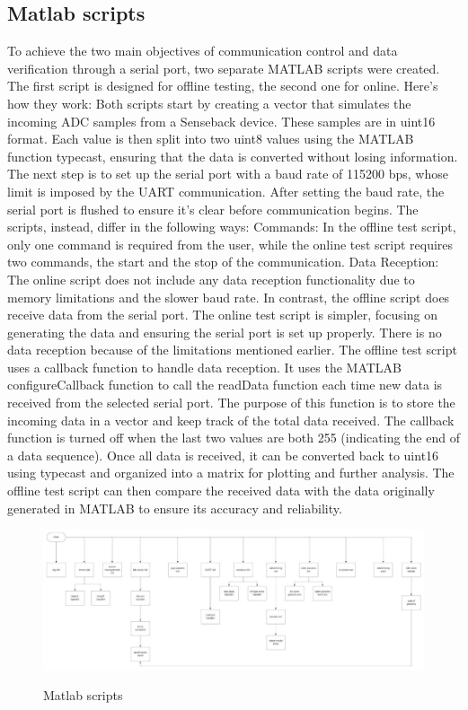 \documentclass{Configuration_Files/PoliMi3i_thesis}
\begin{document}
\subsection{Matlab scripts}

To achieve the two main objectives of communication control and data verification through a serial port, two separate MATLAB scripts were created. The first script is designed for offline testing, the second one for online. Here's how they work:
Both scripts start by creating a vector that simulates the incoming ADC samples from a Senseback device. These samples are in uint16 format. Each value is then split into two uint8 values using the MATLAB function typecast, ensuring that the data is converted without losing information. The next step is to set up the serial port with a baud rate of 115200 bps, whose limit is imposed by the UART communication. After setting the baud rate, the serial port is flushed to ensure it's clear before communication begins.
The scripts, instead, differ in the following ways:
Commands: In the offline test script, only one command is required from the user, while the online test script requires two commands, the start and the stop of the communication.
Data Reception: The online script does not include any data reception functionality due to memory limitations and the slower baud rate. In contrast, the offline script does receive data from the serial port.
The online test script is simpler, focusing on generating the data and ensuring the serial port is set up properly. There is no data reception because of the limitations mentioned earlier.
The offline test script uses a callback function to handle data reception. It uses the MATLAB configureCallback function to call the readData function each time new data is received from the selected serial port. The purpose of this function is to store the incoming data in a vector and keep track of the total data received. The callback function is turned off when the last two values are both 255 (indicating the end of a data sequence). Once all data is received, it can be converted back to uint16 using typecast and organized into a matrix for plotting and further analysis. The offline test script can then compare the received data with the data originally generated in MATLAB to ensure its accuracy and reliability.

\begin{figure}[H]
	\includegraphics[scale=0.3]{Previous Implementation/Screenshot 2024-08-15 at 10.59.58.png}
	\centering
    \label{prev_3}
    \caption{Matlab scripts}
\end{figure}
\end{document}
